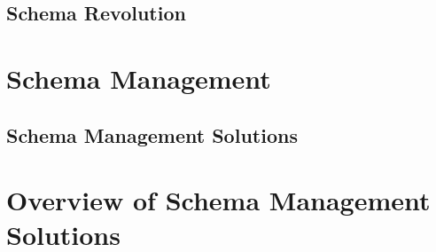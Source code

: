 \subsection{Schema Revolution}

\section{Schema Management}

\subsection{Schema Management Solutions}

\section{Overview of Schema Management Solutions}
